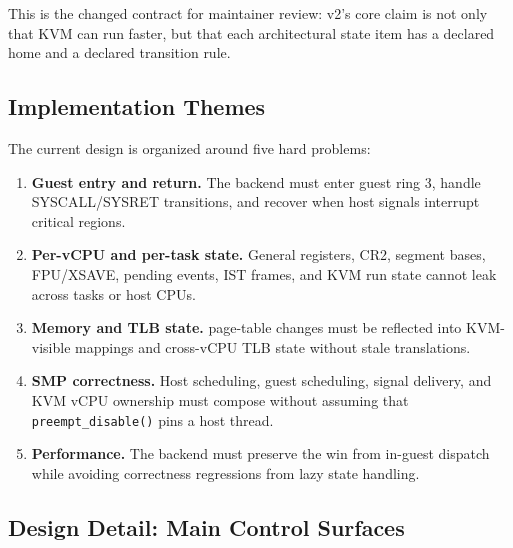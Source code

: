 This is the changed contract for maintainer review: v2's core claim is
not only that KVM can run \UML{} faster, but that each architectural
state item has a declared home and a declared transition rule.

\subsection{Implementation Themes}

The current \KVMvTwo{} design is organized around five hard problems:

\begin{enumerate}
  \item \textbf{Guest entry and return.} The backend must enter guest
        ring 3, handle SYSCALL/SYSRET transitions, and recover when
        host signals interrupt critical regions.
  \item \textbf{Per-vCPU and per-task state.} General registers,
        CR2, segment bases, FPU/XSAVE, pending events, IST frames,
        and KVM run state cannot leak across tasks or host CPUs.
  \item \textbf{Memory and TLB state.} \UML{} page-table changes must
        be reflected into KVM-visible mappings and cross-vCPU TLB
        state without stale translations.
  \item \textbf{SMP correctness.} Host scheduling, guest scheduling,
        signal delivery, and KVM vCPU ownership must compose without
        assuming that \texttt{preempt\_disable()} pins a host thread.
  \item \textbf{Performance.} The backend must preserve the win from
        in-guest dispatch while avoiding correctness regressions from
        lazy state handling.
\end{enumerate}

\subsection{Design Detail: Main Control Surfaces}

